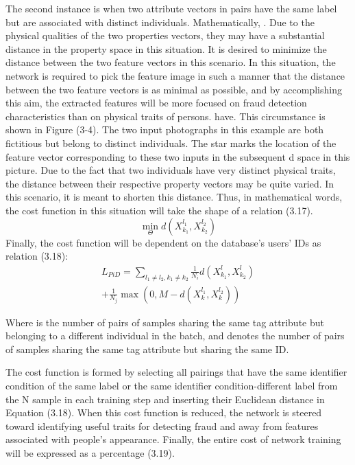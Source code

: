 \documentclass[journal]{IEEEtran}
\begin{document}
The second instance is when two attribute vectors in pairs have the same label but are associated with distinct individuals. Mathematically, . Due to the physical qualities of the two properties vectors, they may have a substantial distance in the property space in this situation. It is desired to minimize the distance between the two feature vectors in this scenario. In this situation, the network is required to pick the feature image in such a manner that the distance between the two feature vectors is as minimal as possible, and by accomplishing this aim, the extracted features will be more focused on fraud detection characteristics than on physical traits of persons. have.
This circumstance is shown in Figure (3-4). The two input photographs in this example are both fictitious but belong to distinct individuals. The star marks the location of the feature vector corresponding to these two inputs in the subsequent d space in this picture. Due to the fact that two individuals have very distinct physical traits, the distance between their respective property vectors may be quite varied. In this scenario, it is meant to shorten this distance.
Thus, in mathematical words, the cost function in this situation will take the shape of a relation (3.17).
\begin{equation}\label{eq:pid2obj}
	\min_{\Theta} {d( X_{k_1}^{l_1},X_{k_2}^{l_2} )} 
\end{equation}
Finally, the cost function will be dependent on the database's users' IDs as relation (3.18):
\begin{multline}\label{eq:pid}
	L_{PiD} = \sum_{l_1 \ne l_2,k_1 \ne k_2}\frac{1}{N_i}d( X_{k_1}^{l},X_{k_2}^{l}) \\
	+\frac{1}{N_j}\max(0,M-d( X_{k}^{l_1},X_{k}^{l_2} ))
\end{multline}

Where is the number of pairs of samples sharing the same tag attribute but belonging to a different individual in the batch, and   denotes the number of pairs of samples sharing the same tag attribute but sharing the same ID.

The cost function is formed by selecting all pairings that have the same identifier condition of the same label or the same identifier condition-different label from the N sample in each training step and inserting their Euclidean distance in Equation (3.18). When this cost function is reduced, the network is steered toward identifying useful traits for detecting fraud and away from features associated with people's appearance.
Finally, the entire cost of network training will be expressed as a percentage (3.19).
\end{document}
